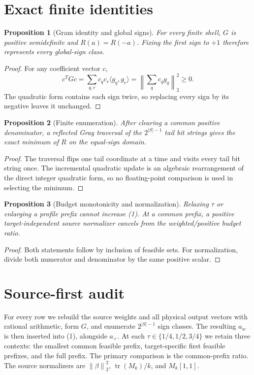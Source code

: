 \documentclass[11pt]{article}
\newtheorem{proposition}{Proposition}
\newcommand{\norm}[1]{\left\lVert #1\right\rVert}
\begin{document}
\section{Exact finite identities}

\begin{proposition}[Gram identity and global signs]
For every finite shell, $G$ is positive semidefinite and $R(a)=R(-a)$.
Fixing the first sign to $+1$ therefore represents every global-sign class.
\end{proposition}
\begin{proof}
For any coefficient vector $c$,
\[
 c^TGc=\sum_{q,r}c_qc_r\langle g_q,g_r\rangle
       =\left\|\sum_qc_qg_q\right\|_2^2\geq0.
\]
The quadratic form contains each sign twice, so replacing every sign by its
negative leaves it unchanged.
\end{proof}

\begin{proposition}[Finite enumeration]
After clearing a common positive denominator, a reflected Gray traversal of
the $2^{|S|-1}$ tail bit strings gives the exact minimum of $R$ on the
equal-sign domain.
\end{proposition}
\begin{proof}
The traversal flips one tail coordinate at a time and visits every tail bit
string once.  The incremental quadratic update is an algebraic rearrangement
of the direct integer quadratic form, so no floating-point comparison is used
in selecting the minimum.
\end{proof}

\begin{proposition}[Budget monotonicity and normalization]
Relaxing $\tau$ or enlarging a profile prefix cannot increase (1).  At a
common prefix, a positive target-independent source normalizer cancels from
the weighted/positive budget ratio.
\end{proposition}
\begin{proof}
Both statements follow by inclusion of feasible sets.  For normalization,
divide both numerator and denominator by the same positive scalar.
\end{proof}

\section{Source-first audit}

For every row we rebuild the source weights and all physical output vectors
with rational arithmetic, form $G$, and enumerate $2^{|S|-1}$ sign classes.
The resulting $a_w$ is then inserted into (1), alongside $a_+$.  At each
$\tau\in\{1/4,1/2,3/4\}$ we retain three contexts: the smallest common
feasible prefix, target-specific first feasible prefixes, and the full prefix.
The primary comparison is the common-prefix ratio.  The source normalizers
are $\norm\beta_2^2$, $\operatorname{tr}(M_k)/k$, and $M_k[1,1]$.
\end{document}

